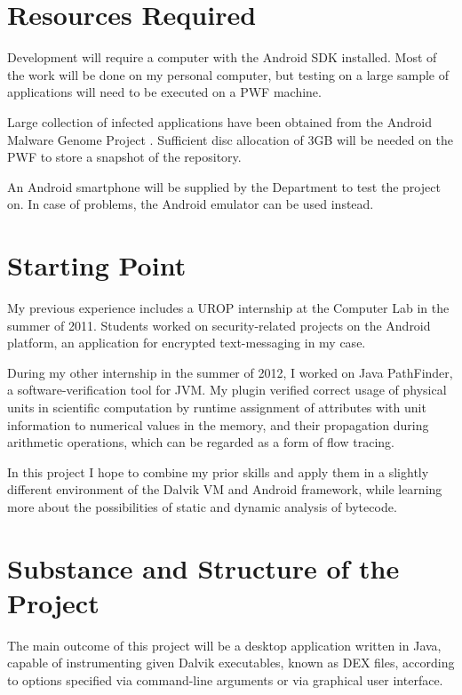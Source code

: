 \documentclass[12pt]{article}
\begin{document}
\section*{Resources Required}

Development will require a computer with the Android SDK installed. Most 
of the work will be done on my personal computer, but testing on a large 
sample of applications will need to be executed on a PWF machine. 

Large collection of infected applications have been obtained from the
Android Malware Genome Project \cite{www.malgenomeproject.org}. 
Sufficient disc allocation of 3GB will be needed on the PWF to store
a snapshot of the repository. 

An Android smartphone will be supplied by the Department to test 
the project on. In case of problems, the Android emulator can be used 
instead.

\section*{Starting Point}

My previous experience includes a UROP internship at the Computer Lab
in the summer of 2011. Students worked on security-related projects on
the Android platform, an application for encrypted text-messaging in my
case.

During my other internship in the summer of 2012, I worked on Java PathFinder,
a software-verification tool for JVM. My plugin verified correct usage of 
physical units in scientific computation by runtime assignment of attributes 
with unit information to numerical values in the memory, and their propagation 
during arithmetic operations, which can be regarded as a form of flow tracing. 

In this project I hope to combine my prior skills and apply them in a 
slightly different environment of the Dalvik VM and Android framework,
while learning more about the possibilities of static and dynamic analysis
of bytecode.

\section*{Substance and Structure of the Project}

The main outcome of this project will be a desktop application written 
in Java, capable of instrumenting given Dalvik executables, known as DEX
files, according to options specified via command-line arguments or via
graphical user interface.
\end{document}
